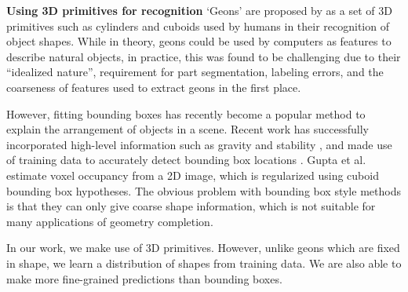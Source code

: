 \documentclass[10pt,twocolumn,letterpaper]{article}
\makeatletter
\newcommand*{\ea}{et al.\@\xspace}
\renewcommand{\paragraph}{\vspace{2pt}\noindent\textbf}
\makeatother
\begin{document}
\paragraph{Using 3D primitives for recognition}
`Geons' are proposed by \cite{bieberman-rbc-1987} as a set of 3D primitives such as cylinders and cuboids used by humans in their recognition of object shapes.
While in theory, geons could be used by computers  as features to describe natural objects, in practice, this was found to be challenging \cite{dickinson-iavc-1997} due to their ``idealized nature'', requirement for part segmentation, labeling errors, and the coarseness of features used to extract geons in the first place.

However, fitting bounding boxes has recently become a popular method to explain the arrangement of objects in a scene.
Recent work has successfully incorporated high-level information such as gravity and stability
 \cite{shao-siggraphasia-2014, jia-cvpr-2013}, and made use of training data to accurately detect bounding box locations \cite{hedau-cvpr-2012}.
Gupta \ea \cite{gupta-cvpr-2011} estimate voxel occupancy from a 2D image, which is regularized using cuboid bounding box hypotheses.
The obvious problem with bounding box style methods is that they can only give coarse shape information, which is not suitable for many applications of geometry completion.

In our work, we make use of 3D primitives.
However, unlike geons which are fixed in shape, we learn a distribution of shapes from training data.
We are also able to make more fine-grained predictions than bounding boxes.
\end{document}
